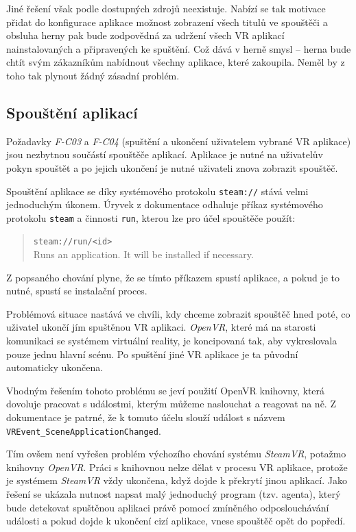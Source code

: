 Jiné řešení však podle dostupných zdrojů neexistuje. Nabízí se tak
motivace přidat do konfigurace aplikace možnost zobrazení všech titulů
ve spouštěči a obsluha herny pak bude zodpovědná za udržení všech VR aplikací 
nainstalovaných a připravených ke spuštění. Což dává v herně smysl --
herna bude chtít svým zákazníkům nabídnout všechny aplikace, které
zakoupila. Neměl by z toho tak plynout žádný zásadní problém.

\subsection{Spouštění
aplikací}\label{spouux161tux11bnuxed-aplikacuxed}

Požadavky \emph{F-C03} a \emph{F-C04} (spuštění a ukončení uživatelem
vybrané VR aplikace) jsou nezbytnou součástí spouštěče
aplikací. Aplikace je nutné na uživatelův pokyn spouštět a po jejich ukončení 
je nutné uživateli znova zobrazit spouštěč.

Spouštění aplikace se díky systémového protokolu \texttt{steam://} stává
velmi jednoduchým úkonem. Úryvek z dokumentace \autocite{protocoldocs} odhaluje příkaz
systémového protokolu \texttt{steam} a činnosti \texttt{run}, kterou lze
pro účel spouštěče použít:

\begin{quote}
\texttt{steam://run/\textless{}id\textgreater{}}\\
Runs an application. It will be installed if necessary.
\end{quote}

Z popsaného chování plyne, že se tímto příkazem spustí aplikace, a pokud je
to nutné, spustí se instalační proces. 

Problémová situace nastává ve
chvíli, kdy chceme zobrazit spouštěč hned poté, co uživatel
ukončí jím spuštěnou VR aplikaci. \emph{OpenVR}, které má na starosti
komunikaci se systémem virtuální reality, je koncipovaná tak, 
aby vykreslovala pouze jednu hlavní scénu. Po spuštění jiné VR aplikace 
je ta původní automaticky ukončena.

Vhodným řešením tohoto problému se jeví použití OpenVR knihovny, která
dovoluje pracovat s událostmi, kterým můžeme naslouchat a reagovat na
ně. Z dokumentace \autocite{openvrdocs} je patrné, že k tomuto účelu slouží událost s názvem
\texttt{VREvent\_SceneApplicationChanged}. 

Tím ovšem není vyřešen
problém výchozího chování systému \emph{SteamVR}, potažmo knihovny
\emph{OpenVR}. Práci s knihovnou nelze dělat v procesu VR aplikace,
protože je systémem \emph{SteamVR} vždy ukončena, když dojde k 
překrytí jinou aplikací. Jako řešení se ukázala nutnost napsat malý 
jednoduchý program (tzv. agenta), který bude detekovat spuštěnou aplikaci právě
pomocí zmíněného odposlouchávání události a pokud dojde k ukončení cizí 
aplikace, vnese spouštěč opět do popředí.

